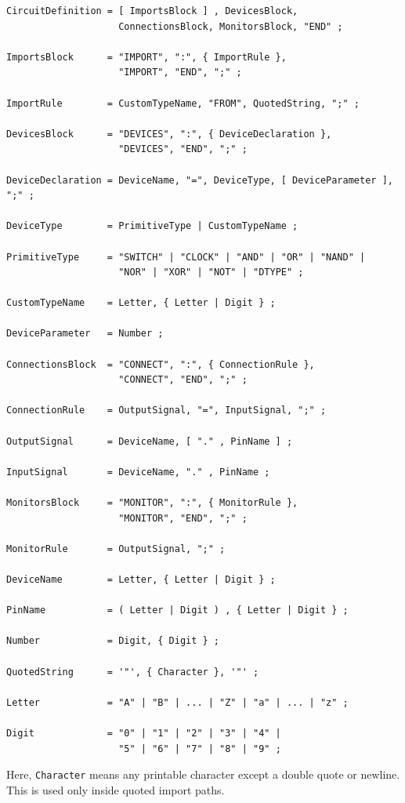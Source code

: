 \documentclass[10pt,a4paper]{article}
\begin{document}
\begin{verbatim}
CircuitDefinition = [ ImportsBlock ] , DevicesBlock,
                    ConnectionsBlock, MonitorsBlock, "END" ;

ImportsBlock      = "IMPORT", ":", { ImportRule },
                    "IMPORT", "END", ";" ;

ImportRule        = CustomTypeName, "FROM", QuotedString, ";" ;

DevicesBlock      = "DEVICES", ":", { DeviceDeclaration },
                    "DEVICES", "END", ";" ;

DeviceDeclaration = DeviceName, "=", DeviceType, [ DeviceParameter ], ";" ;

DeviceType        = PrimitiveType | CustomTypeName ;

PrimitiveType     = "SWITCH" | "CLOCK" | "AND" | "OR" | "NAND" |
                    "NOR" | "XOR" | "NOT" | "DTYPE" ;

CustomTypeName    = Letter, { Letter | Digit } ;

DeviceParameter   = Number ;

ConnectionsBlock  = "CONNECT", ":", { ConnectionRule },
                    "CONNECT", "END", ";" ;

ConnectionRule    = OutputSignal, "=", InputSignal, ";" ;

OutputSignal      = DeviceName, [ "." , PinName ] ;

InputSignal       = DeviceName, "." , PinName ;

MonitorsBlock     = "MONITOR", ":", { MonitorRule },
                    "MONITOR", "END", ";" ;

MonitorRule       = OutputSignal, ";" ;

DeviceName        = Letter, { Letter | Digit } ;

PinName           = ( Letter | Digit ) , { Letter | Digit } ;

Number            = Digit, { Digit } ;

QuotedString      = '"', { Character }, '"' ;

Letter            = "A" | "B" | ... | "Z" | "a" | ... | "z" ;

Digit             = "0" | "1" | "2" | "3" | "4" |
                    "5" | "6" | "7" | "8" | "9" ;
\end{verbatim}

Here, \texttt{Character} means any printable character except a double quote or
newline. This is used only inside quoted import paths.
\end{document}
